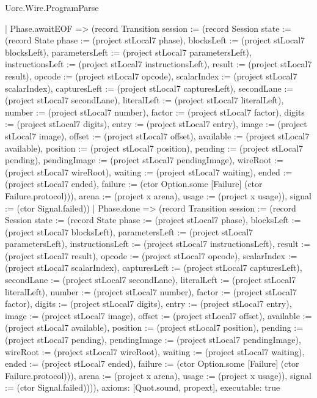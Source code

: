 \begin{lexlean}{Uorc.Wire.ProgramParse}
\begin{semanticmodule}
{    | Phase.awaitEOF => (record Transition {session := (record Session {state := (record State {phase := (project stLocal7 phase), blocksLeft := (project stLocal7 blocksLeft), parametersLeft := (project stLocal7 parametersLeft), instructionsLeft := (project stLocal7 instructionsLeft), result := (project stLocal7 result), opcode := (project stLocal7 opcode), scalarIndex := (project stLocal7 scalarIndex), capturesLeft := (project stLocal7 capturesLeft), secondLane := (project stLocal7 secondLane), literalLeft := (project stLocal7 literalLeft), number := (project stLocal7 number), factor := (project stLocal7 factor), digits := (project stLocal7 digits), entry := (project stLocal7 entry), image := (project stLocal7 image), offset := (project stLocal7 offset), available := (project stLocal7 available), position := (project stLocal7 position), pending := (project stLocal7 pending), pendingImage := (project stLocal7 pendingImage), wireRoot := (project stLocal7 wireRoot), waiting := (project stLocal7 waiting), ended := (project stLocal7 ended), failure := (ctor Option.some [Failure] (ctor Failure.protocol))}), arena := (project x arena), usage := (project x usage)}), signal := (ctor Signal.failed)})
    | Phase.done => (record Transition {session := (record Session {state := (record State {phase := (project stLocal7 phase), blocksLeft := (project stLocal7 blocksLeft), parametersLeft := (project stLocal7 parametersLeft), instructionsLeft := (project stLocal7 instructionsLeft), result := (project stLocal7 result), opcode := (project stLocal7 opcode), scalarIndex := (project stLocal7 scalarIndex), capturesLeft := (project stLocal7 capturesLeft), secondLane := (project stLocal7 secondLane), literalLeft := (project stLocal7 literalLeft), number := (project stLocal7 number), factor := (project stLocal7 factor), digits := (project stLocal7 digits), entry := (project stLocal7 entry), image := (project stLocal7 image), offset := (project stLocal7 offset), available := (project stLocal7 available), position := (project stLocal7 position), pending := (project stLocal7 pending), pendingImage := (project stLocal7 pendingImage), wireRoot := (project stLocal7 wireRoot), waiting := (project stLocal7 waiting), ended := (project stLocal7 ended), failure := (ctor Option.some [Failure] (ctor Failure.protocol))}), arena := (project x arena), usage := (project x usage)}), signal := (ctor Signal.failed)}))),
  axioms: [Quot.sound, propext],
  executable: true
}


\end{semanticmodule}
\end{lexlean}
